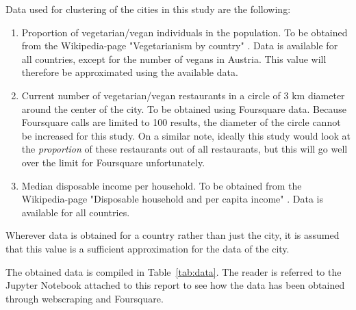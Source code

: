 \documentclass[12pt,a4paper]{article}
\begin{document}
Data used for clustering of the cities in this study are the following:
\begin{enumerate}
	\item Proportion of vegetarian/vegan individuals in the population. To be obtained from the Wikipedia-page "Vegetarianism by country" \cite{wikiVega}. Data is available for all countries, except for the number of vegans in Austria. This value will therefore be approximated using the available data. 
	\item Current number of vegetarian/vegan restaurants in a circle of 3 km diameter around the center of the city. To be obtained using Foursquare data. Because Foursquare calls are limited to 100 results, the diameter of the circle cannot be increased for this study. On a similar note, ideally this study would look at the \textit{proportion} of these restaurants out of all restaurants, but this will go well over the limit for Foursquare unfortunately. 
	\item Median disposable income per household. To be obtained from the Wikipedia-page "Disposable household and per capita income" \cite{wikiIncome}. Data is available for all countries. 
\end{enumerate}
Wherever data is obtained for a country rather than just the city, it is assumed that this value is a sufficient approximation for the data of the city. 

The obtained data is compiled in Table~\ref{tab:data}. The reader is referred to the Jupyter Notebook attached to this report to see how the data has been obtained through webscraping and Foursquare. 
\end{document}
